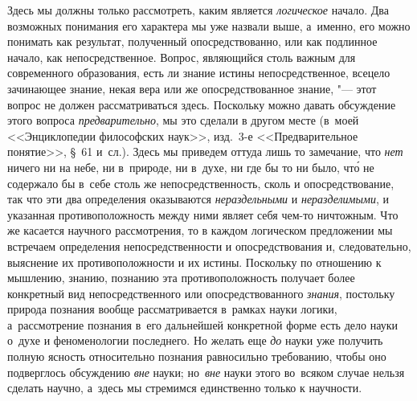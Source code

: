 Здесь мы должны только рассмотреть, каким является {\em логическое} начало. Два
возможных понимания его характера мы уже назвали выше, а~именно, его можно
понимать как результат, полученный опосредствованно, или как подлинное начало,
как непосредственное. Вопрос, являющийся столь важным для современного
образования, есть ли знание истины непосредственное, всецело зачинающее знание,
некая вера или же опосредствованное знание, "--- этот вопрос не должен
рассматриваться здесь. Поскольку можно давать обсуждение этого вопроса
{\em предварительно}, мы это сделали в другом месте (в~моей <<Энциклопедии
философских наук>>, изд.~3-е <<Предварительное понятие>>, \S~61 и~сл.). Здесь
мы приведем оттуда лишь то замечание, что {\em нет} ничего ни на небе, ни
в~природе, ни в~духе, ни где бы то ни было, чт\'{о} не содержало бы в~себе
столь же непосредственность, сколь и опосредствование, так что эти два
определения оказываются {\em нераздельными} и {\em неразделимыми}, и указанная
противоположность между ними являет себя чем-то ничтожным. Что же касается
научного рассмотрения, то в каждом логическом предложении мы встречаем
определения непосредственности и опосредствования и, следовательно, выяснение
их противоположности и их истины. Поскольку по отношению к мышлению, знанию,
познанию эта противоположность получает более конкретный вид непосредственного
или опосредствованного {\em знания}, постольку природа познания вообще
рассматривается в~рамках науки логики, а~рассмотрение познания в~его дальнейшей
конкретной форме есть дело науки о~духе и феноменологии последнего. Но желать
еще {\em до} науки уже получить полную ясность относительно познания
равносильно требованию, чтобы оно подверглось обсуждению {\em вне} науки;
но~{\em вне} науки этого во~всяком случае нельзя сделать научно, а~здесь мы
стремимся единственно только к научности.

